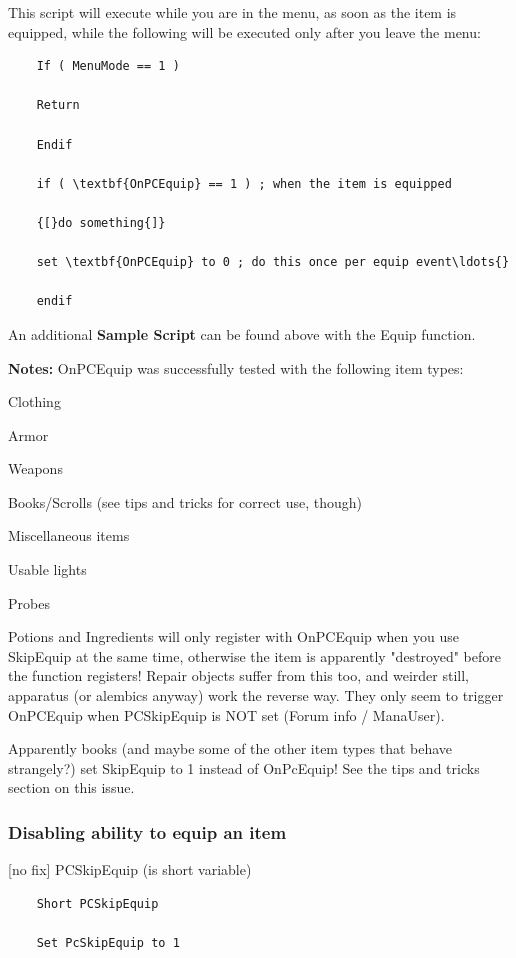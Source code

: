 This script will execute while you are in the menu, as soon as the item
is equipped, while the following will be executed only after you leave
the menu:

\begin{lstlisting}
	If ( MenuMode == 1 )
	
	Return
	
	Endif
	
	if ( \textbf{OnPCEquip} == 1 ) ; when the item is equipped
	
	{[}do something{]}
	
	set \textbf{OnPCEquip} to 0 ; do this once per equip event\ldots{}
	
	endif
\end{lstlisting}

An additional \textbf{Sample Script} can be found above with the Equip
function.

\textbf{Notes:} OnPCEquip was successfully tested with the following
item types:

Clothing

Armor

Weapons

Books/Scrolls (see tips and tricks for correct use, though)

Miscellaneous items

Usable lights

Probes

Potions and Ingredients will only register with OnPCEquip when you use
SkipEquip at the same time, otherwise the item is apparently "destroyed"
before the function registers! Repair objects suffer from this too, and
weirder still, apparatus (or alembics anyway) work the reverse way. They
only seem to trigger OnPCEquip when PCSkipEquip is NOT set (Forum info /
ManaUser).

Apparently books (and maybe some of the other item types that behave
strangely?) set SkipEquip to 1 instead of OnPcEquip! See the tips and
tricks section on this issue.

\hypertarget{disabling-ability-to-equip-an-item}{%
\subsubsection{Disabling ability to equip an
item}\label{disabling-ability-to-equip-an-item}}

	{[}no fix{]} PCSkipEquip (is short variable)

\begin{lstlisting}	
	Short PCSkipEquip
	
	Set PcSkipEquip to 1
\end{lstlisting}

